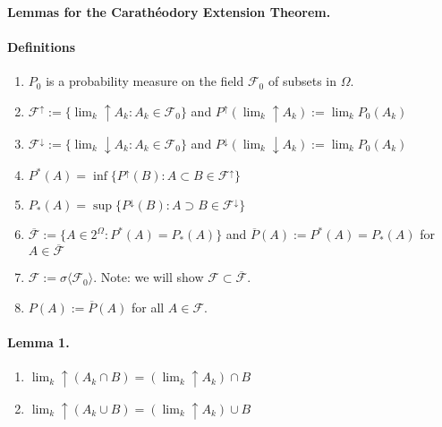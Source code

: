 \documentclass[10pt,letterpaper]{article}
\begin{document}
\begin{center}
\Large \bf
Lemmas for the Carath\'eodory Extension Theorem.
\end{center}

\paragraph{Definitions}
\begin{enumerate}
\item $P_0$ is a probability measure on the field $\mathcal F_0$ of subsets in $\Omega$.
\item  $\mathcal F^\uparrow := \{\lim_k\!\!\uparrow A_k : A_k\in \mathcal F_0  \}$ and  $P^\uparrow(\lim_k\!\!\uparrow A_k) := \lim_k P_0(A_k)$ 
\item  $\mathcal F^\downarrow := \{\lim_k\!\!\downarrow A_k : A_k\in \mathcal F_0  \}$ and  $P^\downarrow(\lim_k\!\!\downarrow A_k) := \lim_k P_0(A_k)$ 
\item  $P^*(A)=\inf\{P^\uparrow(B): A\subset B\in \mathcal F^\uparrow  \}$
\item $P_*(A)=\sup\{P^\downarrow(B): A\supset B\in \mathcal F^\downarrow  \}$
\item  $\overline{\mathcal F}:=\{ A\in 2^\Omega : P^*(A) = P_*(A)\}$ and $\overline P(A):=P^*(A)=P_*(A)$ for $A\in \overline{\mathcal F}$
\item $\mathcal F :=\sigma\langle \mathcal F_0 \rangle$. Note: we will show $\mathcal F\subset \overline{\mathcal F}$.
\item $P(A):= \overline P(A)$ for all $A\in \mathcal F$.
\end{enumerate}


\paragraph{Lemma 1.}
\begin{enumerate}
\item   $\lim_k\!\!\uparrow (A_k \cap B) = (\lim_k\!\!\uparrow A_k) \cap B$
\item $\lim_k\!\!\uparrow (A_k \cup B) = (\lim_k\!\!\uparrow A_k) \cup B$
\end{enumerate}


\end{document}
